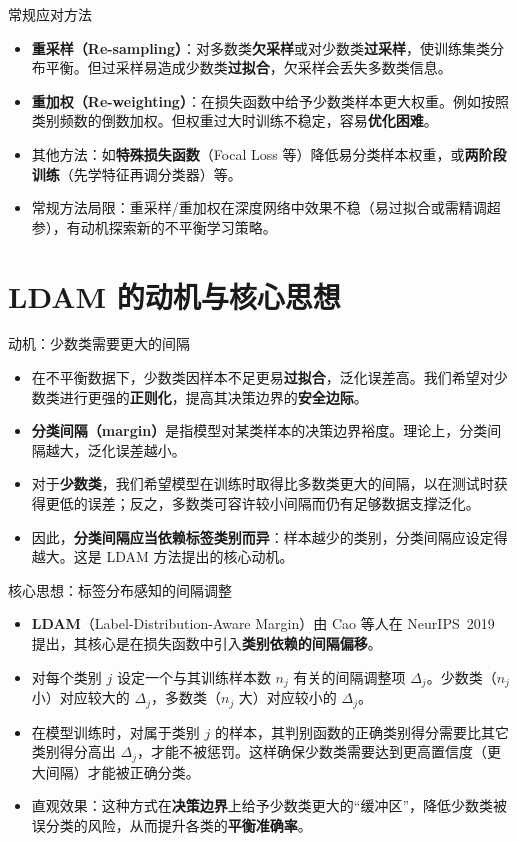 \documentclass{beamer}
\begin{document}
\begin{frame}{常规应对方法}
    \begin{itemize}
        \item \textbf{重采样（Re-sampling）}：对多数类\textbf{欠采样}或对少数类\textbf{过采样}，使训练集类分布平衡。但过采样易造成少数类\textbf{过拟合}，欠采样会丢失多数类信息。
        \item \textbf{重加权（Re-weighting）}：在损失函数中给予少数类样本更大权重。例如按照类别频数的倒数加权。但权重过大时训练不稳定，容易\textbf{优化困难}。
        \item 其他方法：如\textbf{特殊损失函数}（Focal Loss 等）降低易分类样本权重，或\textbf{两阶段训练}（先学特征再调分类器）等。
        \item 常规方法局限：重采样/重加权在深度网络中效果不稳（易过拟合或需精调超参），有动机探索新的不平衡学习策略。
    \end{itemize}
\end{frame}

\section{LDAM 的动机与核心思想}
\begin{frame}{动机：少数类需要更大的间隔}
    \begin{itemize}
        \item 在不平衡数据下，少数类因样本不足更易\textbf{过拟合}，泛化误差高。我们希望对少数类进行更强的\textbf{正则化}，提高其决策边界的\textbf{安全边际}。
        \item \textbf{分类间隔（margin）}是指模型对某类样本的决策边界裕度。理论上，分类间隔越大，泛化误差越小。
        \item 对于\textbf{少数类}，我们希望模型在训练时取得比多数类更大的间隔，以在测试时获得更低的误差；反之，多数类可容许较小间隔而仍有足够数据支撑泛化。
        \item 因此，\textbf{分类间隔应当依赖标签类别而异}：样本越少的类别，分类间隔应设定得越大。这是 LDAM 方法提出的核心动机。
    \end{itemize}
\end{frame}

\begin{frame}{核心思想：标签分布感知的间隔调整}
    \begin{itemize}
        \item \textbf{LDAM}（Label-Distribution-Aware Margin）由 Cao 等人在 NeurIPS~2019 提出，其核心是在损失函数中引入\textbf{类别依赖的间隔偏移}。
        \item 对每个类别 $j$ 设定一个与其训练样本数 $n_j$ 有关的间隔调整项 $\Delta_j$。少数类（$n_j$ 小）对应较大的 $\Delta_j$，多数类（$n_j$ 大）对应较小的 $\Delta_j$。
        \item 在模型训练时，对属于类别 $j$ 的样本，其判别函数的正确类别得分需要比其它类别得分高出 $\Delta_j$，才能不被惩罚。这样确保少数类需要达到更高置信度（更大间隔）才能被正确分类。
        \item 直观效果：这种方式在\textbf{决策边界}上给予少数类更大的“缓冲区”，降低少数类被误分类的风险，从而提升各类的\textbf{平衡准确率}。
    \end{itemize}
\end{frame}
\end{document}
